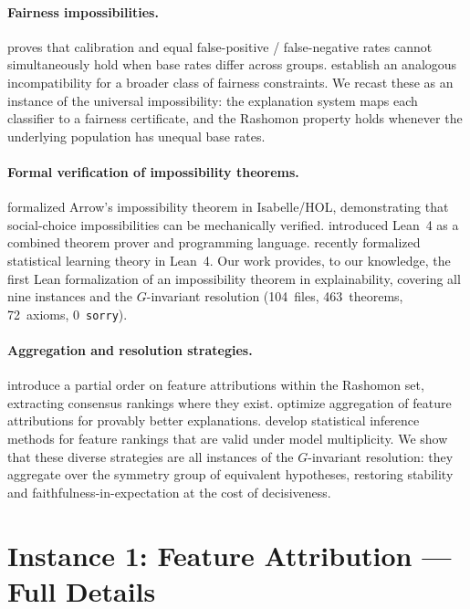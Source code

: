\documentclass{article}
\begin{document}
\paragraph{Fairness impossibilities.}
\citet{chouldechova2017fair} proves that calibration and equal false-positive /
false-negative rates cannot simultaneously hold when base rates differ across
groups.  \citet{kleinberg2017inherent} establish an analogous incompatibility
for a broader class of fairness constraints.  We recast these as an instance of
the universal impossibility: the explanation system maps each classifier to a
fairness certificate, and the Rashomon property holds whenever the underlying
population has unequal base rates.

\paragraph{Formal verification of impossibility theorems.}
\citet{nipkow2009social} formalized Arrow's impossibility theorem in
Isabelle/HOL, demonstrating that social-choice impossibilities can be
mechanically verified.  \citet{demoura2021lean4} introduced Lean~4 as a
combined theorem prover and programming language.
\citet{zhang2026statistical} recently formalized statistical learning theory in
Lean~4.  Our work provides, to our knowledge, the first Lean formalization of
an impossibility theorem in explainability, covering all nine instances and the
$G$-invariant resolution (104~files, 463~theorems, 72~axioms, 0~\texttt{sorry}).

\paragraph{Aggregation and resolution strategies.}
\citet{laberge2023partial} introduce a partial order on feature attributions
within the Rashomon set, extracting consensus rankings where they exist.
\citet{decker2024provably} optimize aggregation of feature attributions for
provably better explanations.
\citet{herren2023statistical} develop statistical inference methods for feature
rankings that are valid under model multiplicity.  We show that these diverse
strategies are all instances of the $G$-invariant resolution: they aggregate over the symmetry group of
equivalent hypotheses, restoring stability and faithfulness-in-expectation at
the cost of decisiveness.

\section{Instance 1: Feature Attribution --- Full Details}
\label{sec:attr-full}
\end{document}
